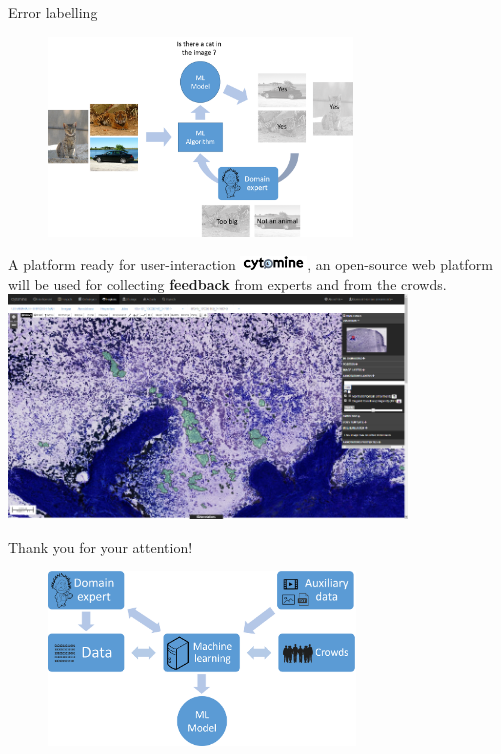 \documentclass{beamer}
\begin{document}
\begin{frame}{Error labelling}
	\begin{figure}
		\center
		\includegraphics[height=200px]{images/error_labelling.png}
	\end{figure}
\end{frame}

\begin{frame}{A platform ready for user-interaction}
	\includegraphics[height=1em]{images/cytomine_typo.png}, an open-source web platform will be used for collecting \textbf{feedback} from experts and from the crowds. \\  
	\vspace*{0.25cm}
	\hspace*{-0.75in}\includegraphics[width=400px]{images/cytomine.png}
\end{frame}



\begin{frame}
	\begin{center}
	
		Thank you for your attention! \\ 
		
	\end{center}
	\vfill
	\begin{figure}
		\includegraphics[height=175px]{images/ml_expert_crowds_aux_uni.png}
	\end{figure}
	\vfill
\end{frame}
\end{document}
